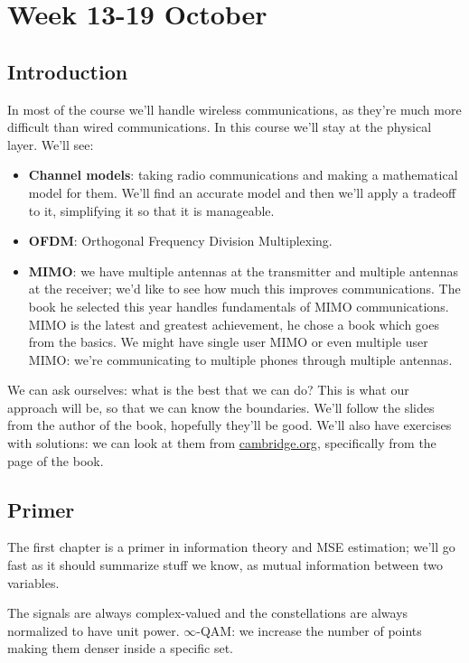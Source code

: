 \documentclass[a4paper, 12pt]{book}
\begin{document}
\chapter[Week 13-19 Oct]{Week 13-19 October}

\section{Introduction}
In most of the course we'll handle wireless communications, as they're much more difficult than wired communications. In this course we'll stay at the physical layer.
We'll see:
\begin{itemize}
    \item \textbf{Channel models}: taking radio communications and making a mathematical model for them. We'll find an accurate model and then we'll apply a tradeoff to it, simplifying it so that it is manageable.
    \item \textbf{OFDM}: Orthogonal Frequency Division Multiplexing.
    \item \textbf{MIMO}: we have multiple antennas at the transmitter and multiple antennas at the receiver; we'd like to see how much this improves communications. The book he selected this year handles fundamentals of MIMO communications. MIMO is the latest and greatest achievement, he chose a book which goes from the basics. We might have single user MIMO or even multiple user MIMO: we're communicating to multiple phones through multiple antennas.
\end{itemize}

We can ask ourselves: what is the best that we can do? This is what our approach will be, so that we can know the boundaries.
We'll follow the slides from the author of the book, hopefully they'll be good.
We'll also have exercises with solutions: we can look at them from \href{https://cambridge.org}{cambridge.org}, specifically from the page of the book.

\section{Primer}
The first chapter is a primer in information theory and MSE estimation; we'll go fast as it should summarize stuff we know, as mutual information between two variables.

\begin{purplebox}[Note]
    The signals are always complex-valued and the constellations are always normalized to have unit power.
    $\infty$-QAM: we increase the number of points making them denser inside a specific set.
\end{purplebox}
\end{document}
